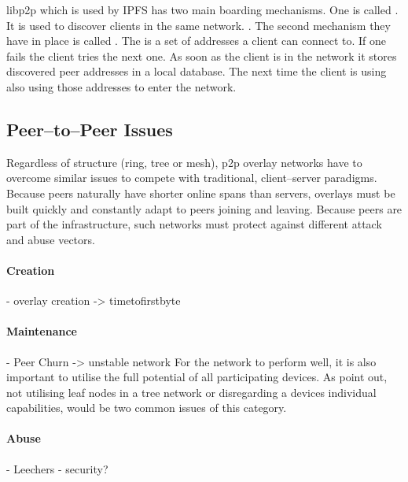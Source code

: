 libp2p which is used by IPFS has two main boarding mechanisms. One is called . It is used to discover clients in the same network. \cite{ipfs-bootstrapping}.
The second mechanism they have in place is called . The  is a set of addresses a client can connect to. If one fails the client tries the next one. As soon as the client is in the network it stores discovered peer addresses in a local database. The next time the client is using also using those addresses to enter the network.

\subsection{Peer–to–Peer Issues}
Regardless of structure (ring, tree or mesh), \gls{p2p} overlay networks have to overcome similar issues to compete with traditional, client–server paradigms. Because peers naturally have shorter online spans than servers, overlays must be built quickly and constantly adapt to peers joining and leaving. Because peers are part of the infrastructure, such networks must protect against different attack and abuse vectors.

\paragraph{Creation}
- overlay creation -> timetofirstbyte

\paragraph{Maintenance}
- Peer Churn -> unstable network \cite{dht-churn}
For the network to perform well, it is also important to utilise the full potential of all participating devices. As \citet[\S{III}]{multicast-problems} point out, not utilising leaf nodes in a tree network or disregarding a devices individual capabilities, would be two common issues of this category.

\paragraph{Abuse}
- Leechers
- security?
